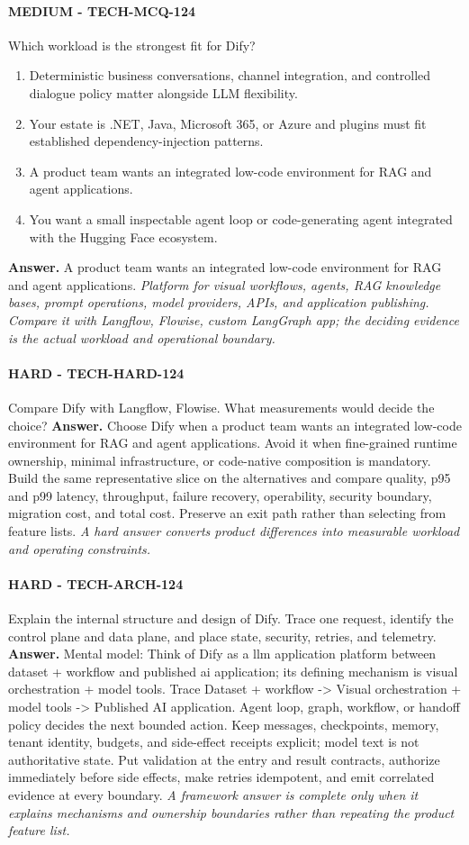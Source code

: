 \paragraph{MEDIUM - TECH-MCQ-124} Which workload is the strongest fit for Dify?
\begin{enumerate}[label=\Alph*.]
\item Deterministic business conversations, channel integration, and controlled dialogue policy matter alongside LLM flexibility.
\item Your estate is .NET, Java, Microsoft 365, or Azure and plugins must fit established dependency-injection patterns.
\item A product team wants an integrated low-code environment for RAG and agent applications.
\item You want a small inspectable agent loop or code-generating agent integrated with the Hugging Face ecosystem.
\end{enumerate}
\textbf{Answer.} A product team wants an integrated low-code environment for RAG and agent applications.
\textit{Platform for visual workflows, agents, RAG knowledge bases, prompt operations, model providers, APIs, and application publishing. Compare it with Langflow, Flowise, custom LangGraph app; the deciding evidence is the actual workload and operational boundary.}
\paragraph{HARD - TECH-HARD-124} Compare Dify with Langflow, Flowise. What measurements would decide the choice?
\textbf{Answer.} Choose Dify when a product team wants an integrated low-code environment for RAG and agent applications. Avoid it when fine-grained runtime ownership, minimal infrastructure, or code-native composition is mandatory. Build the same representative slice on the alternatives and compare quality, p95 and p99 latency, throughput, failure recovery, operability, security boundary, migration cost, and total cost. Preserve an exit path rather than selecting from feature lists.
\textit{A hard answer converts product differences into measurable workload and operating constraints.}
\paragraph{HARD - TECH-ARCH-124} Explain the internal structure and design of Dify. Trace one request, identify the control plane and data plane, and place state, security, retries, and telemetry.
\textbf{Answer.} Mental model: Think of Dify as a llm application platform between dataset + workflow and published ai application; its defining mechanism is visual orchestration + model tools. Trace Dataset + workflow -> Visual orchestration + model tools -> Published AI application. Agent loop, graph, workflow, or handoff policy decides the next bounded action. Keep messages, checkpoints, memory, tenant identity, budgets, and side-effect receipts explicit; model text is not authoritative state. Put validation at the entry and result contracts, authorize immediately before side effects, make retries idempotent, and emit correlated evidence at every boundary.
\textit{A framework answer is complete only when it explains mechanisms and ownership boundaries rather than repeating the product feature list.}
